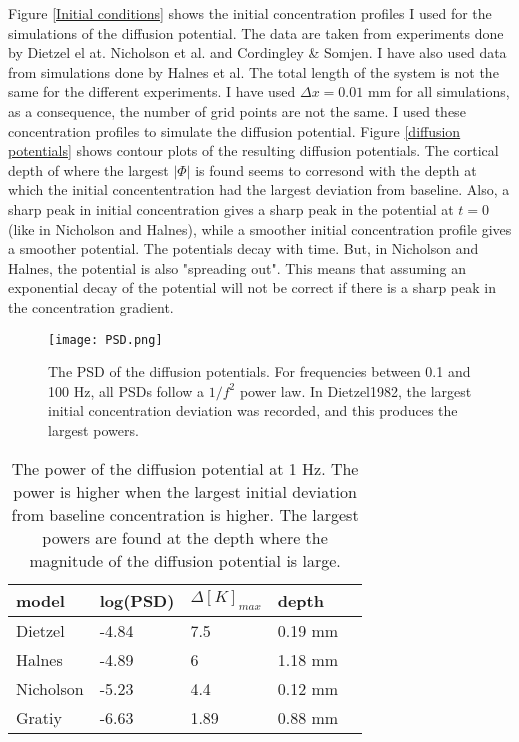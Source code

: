 \documentclass{article}
\begin{document}
 Figure \ref{Initial conditions} shows the initial concentration profiles I used for the simulations of the diffusion potential. The data are taken from experiments done by Dietzel el at. Nicholson et al. and Cordingley \& Somjen. I have also used data from simulations done by Halnes et al. The total length of the system is not the same for the different experiments. I have used $\Delta x = 0.01$ mm for all simulations, as a consequence, the number of grid points are not the same. I used these concentration profiles to simulate the diffusion potential. Figure \ref{diffusion potentials} shows contour plots of the resulting diffusion potentials. The cortical depth of where the largest $|\Phi|$ is found seems to corresond with the depth at which the initial concententration had the largest deviation from baseline. Also, a sharp peak in initial concentration gives a sharp peak in the potential at $t=0$ (like in Nicholson and Halnes), while a smoother initial concentration profile gives a smoother potential. The potentials decay with time. But, in Nicholson and Halnes, the potential is also "spreading out". This means that assuming an exponential decay of the potential will not be correct if there is a sharp peak in the concentration gradient. 
\begin{figure}
  \texttt{[image: PSD.png]}
  \caption{The PSD of the diffusion potentials. For frequencies between 0.1 and 100 Hz, all PSDs follow a $1/f^2$ power law. In Dietzel1982, the largest initial concentration deviation was recorded, and this produces the largest powers.}
  \label{fig:PSD}
\end{figure}




\begin{table}[h!]
  \centering
  \caption{The power of the diffusion potential at 1 Hz. The power is higher when the largest initial deviation from baseline concentration is higher. The largest powers are found at the depth where the magnitude of the diffusion potential is large.}
  \label{tab:psd_magnitude}
  \begin{tabular}{l||l|l|l|l}
model & log(PSD) & $\Delta [K]_{max}$ & depth \\
\hline
Dietzel & -4.84 & 7.5 & 0.19 mm \\
Halnes & -4.89 & 6  & 1.18 mm\\
Nicholson & -5.23 & 4.4 & 0.12 mm \\
Gratiy &-6.63 & 1.89 & 0.88 mm \\



 \end{tabular}
\end{table}
\end{document}
